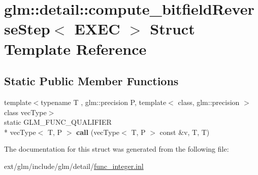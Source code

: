 \hypertarget{structglm_1_1detail_1_1compute__bitfield_reverse_step}{\section{glm\-:\-:detail\-:\-:compute\-\_\-bitfield\-Reverse\-Step$<$ E\-X\-E\-C $>$ Struct Template Reference}
\label{structglm_1_1detail_1_1compute__bitfield_reverse_step}
}
\subsection*{Static Public Member Functions}
\begin{DoxyCompactItemize}
\item 
\hypertarget{structglm_1_1detail_1_1compute__bitfield_reverse_step_ad7d43fd26b9390296e651f7a80e86aca}{{\footnotesize template$<$typename T , glm\-::precision P, template$<$ class, glm\-::precision $>$ class vec\-Type$>$ }\\static G\-L\-M\-\_\-\-F\-U\-N\-C\-\_\-\-Q\-U\-A\-L\-I\-F\-I\-E\-R \\*
vec\-Type$<$ T, P $>$ {\bfseries call} (vec\-Type$<$ T, P $>$ const \&v, T, T)}\label{structglm_1_1detail_1_1compute__bitfield_reverse_step_ad7d43fd26b9390296e651f7a80e86aca}

\end{DoxyCompactItemize}


The documentation for this struct was generated from the following file\-:\begin{DoxyCompactItemize}
\item 
ext/glm/include/glm/detail/\hyperlink{func__integer_8inl}{func\-\_\-integer.\-inl}\end{DoxyCompactItemize}
